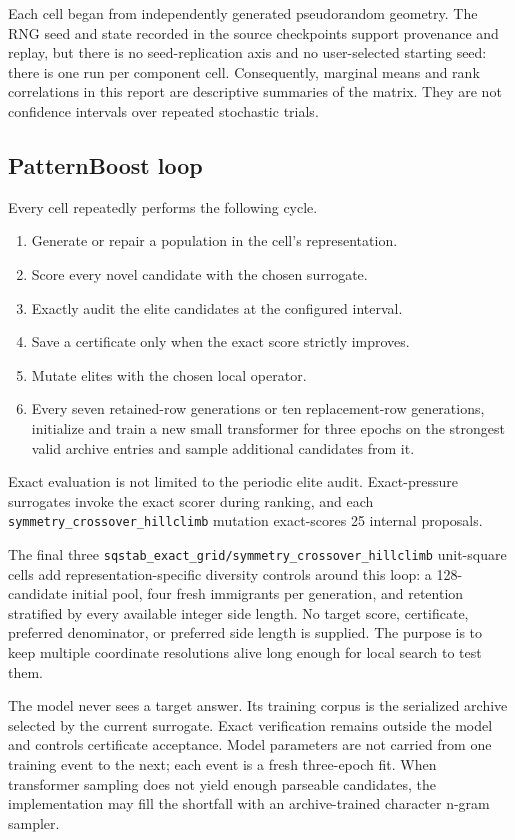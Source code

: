 \documentclass[11pt]{article}
\newcommand{\code}[1]{\texttt{#1}}
\begin{document}
Each cell began from independently generated pseudorandom geometry.  The RNG
seed and state recorded in the source checkpoints support provenance and
replay, but there is no seed-replication axis and no user-selected starting
seed: there is one run per component cell.  Consequently, marginal means and rank
correlations in this report are descriptive summaries of the matrix.  They
are not confidence intervals over repeated stochastic trials.

\subsection{PatternBoost loop}

Every cell repeatedly performs the following cycle.

\begin{enumerate}
\item Generate or repair a population in the cell's representation.
\item Score every novel candidate with the chosen surrogate.
\item Exactly audit the elite candidates at the configured interval.
\item Save a certificate only when the exact score strictly improves.
\item Mutate elites with the chosen local operator.
\item Every seven retained-row generations or ten replacement-row
generations, initialize and train a new small transformer for three epochs on
the strongest valid archive entries and sample additional candidates from it.
\end{enumerate}

Exact evaluation is not limited to the periodic elite audit.  Exact-pressure
surrogates invoke the exact scorer during ranking, and each
\code{symmetry\_crossover\_hillclimb} mutation exact-scores 25 internal
proposals.

The final three
\code{sqstab\_exact\_grid/symmetry\_crossover\_hillclimb} unit-square cells
add representation-specific diversity controls around this loop: a
128-candidate initial pool, four fresh immigrants per generation, and
retention stratified by every available integer side length.  No target score,
certificate, preferred denominator, or preferred side length is supplied.
The purpose is to keep multiple coordinate resolutions alive long enough for
local search to test them.

The model never sees a target answer.  Its training corpus is the serialized
archive selected by the current surrogate.  Exact verification remains
outside the model and controls certificate acceptance.  Model parameters are
not carried from one training event to the next; each event is a fresh
three-epoch fit.  When transformer sampling does not yield enough parseable
candidates, the implementation may fill the shortfall with an archive-trained
character n-gram sampler.
\end{document}
